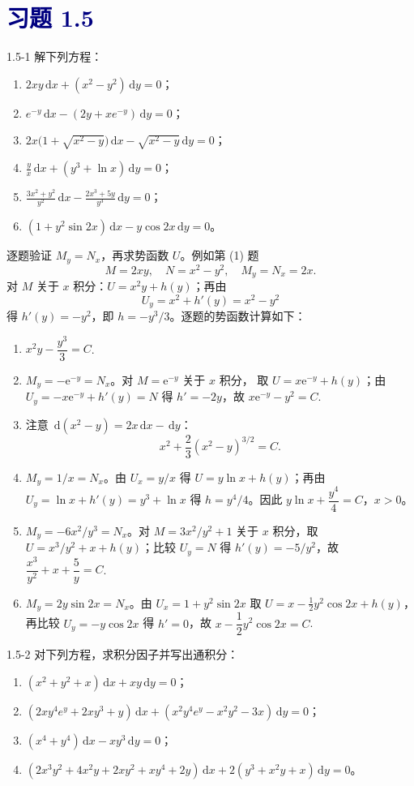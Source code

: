 \documentclass[UTF8,a4paper,11pt]{ctexart}
\newcommand{\dd}{\,\mathrm d}
\newcommand{\e}{\mathrm e}
\newcommand{\sect}[1]{\section*{\textcolor{navy}{习题 #1}}}
\begin{document}
\sect{1.5}
\begin{problem}{1.5-1}
解下列方程：
  \begin{enumerate}[label=(\arabic*)]
    \item $\displaystyle 2xy\dd x+(x^2-y^2)\dd y=0$；
    \item $\displaystyle e^{-y}\dd x-(2y+xe^{-y})\dd y=0$；
    \item $\displaystyle 2x\bigl(1+\sqrt{x^2-y}\bigr)\dd x-\sqrt{x^2-y}\dd y=0$；
    \item $\displaystyle \frac yx\dd x+(y^3+\ln x)\dd y=0$；
    \item $\displaystyle \frac{3x^2+y^2}{y^2}\dd x-\frac{2x^3+5y}{y^3}\dd y=0$；
    \item $\displaystyle (1+y^2\sin2x)\dd x-y\cos2x\dd y=0$。
  \end{enumerate}
\end{problem}

\begin{solution}
逐题验证 $M_y=N_x$，再求势函数 $U$。例如第 (1) 题
\[
M=2xy,\quad N=x^2-y^2,\quad M_y=N_x=2x.
\]
对 $M$ 关于 $x$ 积分：$U=x^2y+h(y)$；再由
\[
U_y=x^2+h'(y)=x^2-y^2
\]
得 $h'(y)=-y^2$，即 $h=-y^3/3$。逐题的势函数计算如下：
\begin{enumerate}[label=(\arabic*)]
\item \(\boxed{x^2y-\dfrac{y^3}{3}=C}\).
\item $M_y=-\e^{-y}=N_x$。对 $M=\e^{-y}$ 关于 $x$ 积分，
取 $U=x\e^{-y}+h(y)$；由 $U_y=-x\e^{-y}+h'(y)=N$
得 $h'=-2y$，故 \(\boxed{x\e^{-y}-y^2=C}\).
\item 注意 $\dd(x^2-y)=2x\dd x-\dd y$：
\[
\boxed{x^2+\frac23(x^2-y)^{3/2}=C}.
\]
\item $M_y=1/x=N_x$。由 $U_x=y/x$ 得
$U=y\ln x+h(y)$；再由 $U_y=\ln x+h'(y)=y^3+\ln x$
得 $h=y^4/4$。因此 \(\boxed{y\ln x+\dfrac{y^4}{4}=C}\)，$x>0$。
\item $M_y=-6x^2/y^3=N_x$。对
$M=3x^2/y^2+1$ 关于 $x$ 积分，取
$U=x^3/y^2+x+h(y)$；比较 $U_y=N$ 得
$h'(y)=-5/y^2$，故 \(\boxed{\dfrac{x^3}{y^2}+x+\dfrac5y=C}\).
\item $M_y=2y\sin2x=N_x$。由 $U_x=1+y^2\sin2x$
取 $U=x-\tfrac12y^2\cos2x+h(y)$，再比较 $U_y=-y\cos2x$
得 $h'=0$，故 \(\boxed{x-\dfrac12y^2\cos2x=C}\).
\end{enumerate}
\end{solution}

\begin{problem}{1.5-2}
对下列方程，求积分因子并写出通积分：
  \begin{enumerate}[label=(\arabic*)]
    \item $\displaystyle (x^2+y^2+x)\dd x+xy\dd y=0$；
    \item $\displaystyle (2xy^4e^y+2xy^3+y)\dd x+(x^2y^4e^y-x^2y^2-3x)\dd y=0$；
    \item $\displaystyle (x^4+y^4)\dd x-xy^3\dd y=0$；
    \item $\displaystyle (2x^3y^2+4x^2y+2xy^2+xy^4+2y)\dd x+2(y^3+x^2y+x)\dd y=0$。
  \end{enumerate}
\end{problem}
\end{document}
